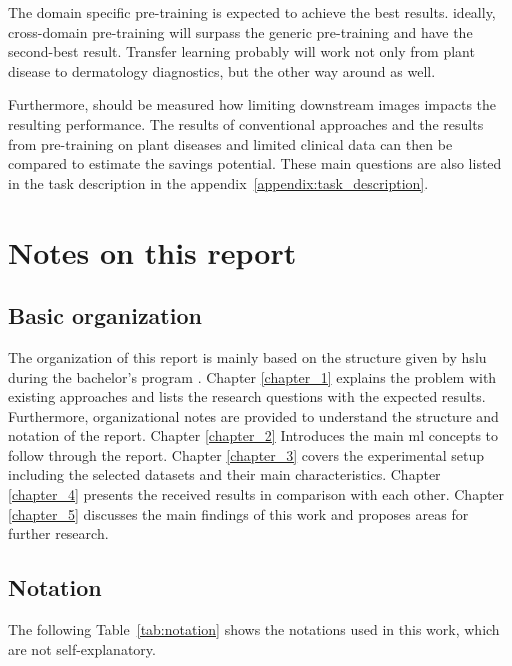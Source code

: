 The domain specific pre-training is expected to achieve the best results.
ideally, cross-domain pre-training will surpass the generic pre-training and have the second-best result.
Transfer learning probably will work not only from plant disease to dermatology diagnostics, but the other way around as well.


Furthermore, should be measured how limiting downstream images impacts the resulting performance. 
The results of conventional approaches and the results from pre-training on plant diseases and limited clinical data can then be compared to estimate the savings potential.
These main questions are also listed in the task description in the appendix~\ref{appendix:task_description}.

\section{Notes on this report}
\subsection{Basic organization}
The organization of this report is mainly based on the structure given by \gls{hslu} during the bachelor's program \autocite{balzert2011}.
Chapter \ref{chapter_1} explains the problem with existing approaches and lists the research questions with the expected results. 
Furthermore, organizational notes are provided to understand the structure and notation of the report.
Chapter \ref{chapter_2} Introduces the main \gls{ml} concepts to follow through the report.
Chapter \ref{chapter_3} covers the experimental setup including the selected datasets and their main characteristics.
Chapter \ref{chapter_4} presents the received results in comparison with each other.
Chapter \ref{chapter_5} discusses the main findings of this work and proposes areas for further research. 

\subsection{Notation}

The following Table~\ref{tab:notation} shows the notations used in this work, which are not self-explanatory.

